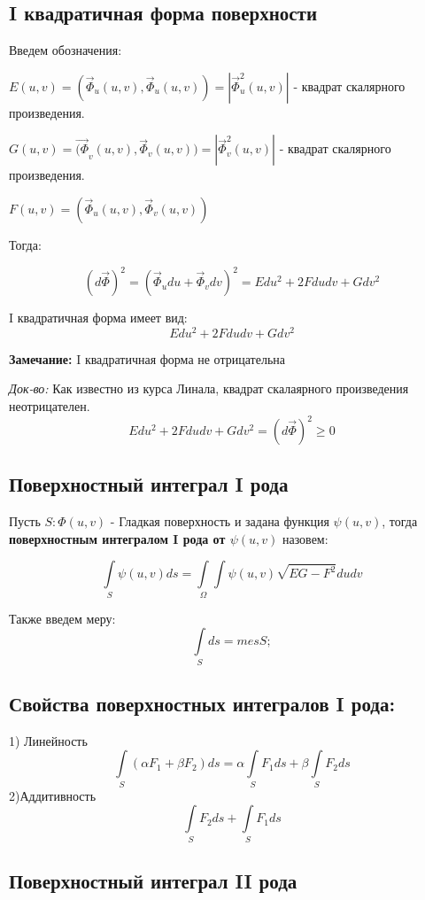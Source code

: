 \documentclass{article}
\begin{document}
\subsection*{I квадратичная форма поверхности}
	
	Введем обозначения:
		
	$E(u , v) = (\vec{\Phi}_u(u , v) , \vec{\Phi}_u( u, v)) = |\vec{\Phi}_u^2( u, v)|$ - квадрат скалярного произведения.
	
	$G(u , v) = \vec{(\Phi}_v(u , v) , \vec{\Phi}_v( u, v)) = |\vec{\Phi}_v^2( u, v)|$ - квадрат скалярного произведения.
	
	$F(u , v) = (\vec{\Phi}_u(u , v) , \vec{\Phi}_v( u, v))$
	
	Тогда:
	
	$$(d\vec{\Phi})^2 = (\vec{\Phi}_u du + \vec{\Phi}_v dv)^2 = Edu^2 + 2Fdudv + Gdv^2$$
	
	I квадратичная форма имеет вид:
	$$Edu^2 + 2Fdudv + Gdv^2$$			
	
\textbf{Замечание:}
	I квадратичная форма не отрицательна
	
\textit{Док-во:}
Как известно из курса Линала, квадрат скалаярного произведения неотрицателен.
	$$Edu^2 + 2Fdudv + Gdv^2 = (d\vec{\Phi})^2 \geqslant 0$$
	
\subsection*{Поверхностный интеграл I рода}
	Пусть $S : \Phi(u , v)$ - Гладкая поверхность и задана функция $\psi(u , v)$, тогда \textbf{поверхностным интегралом I рода от $\psi(u,v)$} назовем:
	
$$
\int\limits_{S} \psi(u , v) ds 
=
\int\limits_{\Omega}\int \psi(u,v)\sqrt{EG - F^2}dudv	
$$		
	
	Также введем меру:
$$
	\int\limits_{S}ds = mesS;
$$	
	
\subsection*{Свойства поверхностных интегралов I рода:}
	1) Линейность
$$
\int\limits_{S} (\alpha F_1 + \beta F_2)ds
=
\alpha\int\limits_{S}  F_1ds
+
\beta\int\limits_{S}  F_2ds
$$
	2)Аддитивность	
$$
\int\limits_{S}  F_2ds
+
\int\limits_{S}  F_1ds
$$



\subsection*{Поверхностный интеграл II рода}
\end{document}
